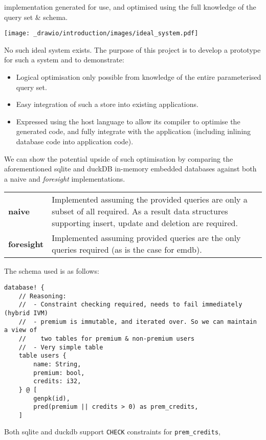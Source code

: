 implementation generated for use, and optimised using the full knowledge of the query set \& schema.
\begin{center}
    \texttt{[image: \_drawio/introduction/images/ideal\_system.pdf]}
\end{center}
\noindent
No such ideal system exists. The purpose of this project is to develop a
prototype for such a system and to demonstrate:
\begin{itemize}
    \setlength\itemsep{0em}
    \item Logical optimisation only possible from knowledge of the entire parameterised query set.
    \item Easy integration of such a store into existing applications.
    \item Expressed using the host language to allow its compiler to optimise the generated code, and fully integrate with the application (including inlining database code into application code).
\end{itemize}
We can show the potential upside of such optimisation by comparing the aforementioned sqlite and duckDB
in-memory embedded databases against both a naive and \textit{foresight} implementations.
\begin{center}
    \begin{tabular}{l p{}}
        \textbf{naive}     & Implemented assuming the provided queries are only a subset of all required. As a result data structures supporting insert, update and deletion are required. \\
        \textbf{foresight} & Implemented assuming provided queries are the only queries required (as is the case for emdb).                                                                \\
    \end{tabular}
\end{center}
The schema used is as follows:
\begin{verbatim}
database! {
    // Reasoning:
    //  - Constraint checking required, needs to fail immediately (hybrid IVM)
    //  - premium is immutable, and iterated over. So we can maintain a view of
    //    two tables for premium & non-premium users
    //  - Very simple table
    table users {
        name: String,
        premium: bool,
        credits: i32,
    } @ [
        genpk(id),
        pred(premium || credits > 0) as prem_credits,
    ]
\end{verbatim}
Both sqlite and duckdb support \texttt{CHECK} constraints for \texttt{prem_credits},
